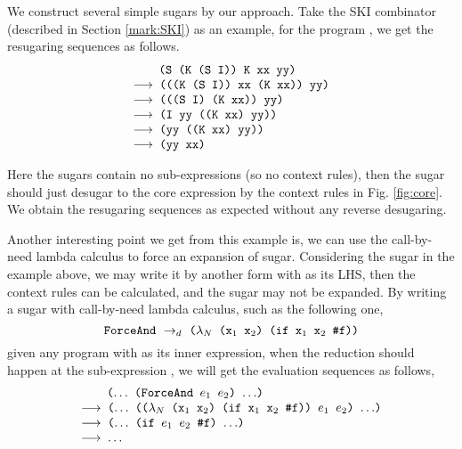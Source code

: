We construct several simple sugars by our approach. Take the SKI combinator (described in Section \ref{mark:SKI}) as an example, for the program , we get the resugaring sequences as follows.
\[
	\begin{array}{l}
		\quad\;\;\Code{ (S (K (S I)) K xx yy)}\\
	\OneStep{ \Code{ (((K (S I)) xx (K xx)) yy)}}\\
	\OneStep{ \Code{ (((S I) (K xx)) yy)}}\\
	\OneStep{ \Code{ (I yy ((K xx) yy))}}\\
	\OneStep{ \Code{ (yy ((K xx) yy))}}\\
	\OneStep{ \Code{ (yy xx)}}\\
	\end{array}
\]




Here the sugars contain no sub-expressions (so no context rules), then the sugar should just desugar to the core expression by the context rules in Fig. \ref{fig:core}.
We obtain the resugaring sequences as expected without any reverse desugaring.

Another interesting point we get from this example is, we can use the call-by-need lambda calculus to force an expansion of sugar. Considering the sugar  in the example above, we may write it by another form with  as its LHS, then the context rules can be calculated, and the sugar may not be expanded. By writing a sugar with call-by-need lambda calculus, such as the following one,
\[
\texttt{ForceAnd} ~\rightarrow_d~ \texttt{($\lambda_N$ ($\mbox{\tt x}_1$ $\mbox{\tt x}_2$) (if $\mbox{\tt x}_1$ $\mbox{\tt x}_2$ \#f))}
\]
given any program with  as its inner expression, when the reduction should happen at the sub-expression , we will get the evaluation sequences as follows,
\[
	\begin{array}{l}
		\quad\;\;\Code{ ($\ldots$ (ForceAnd $e_1$ $e_2$) $\ldots$)}\\
	\OneStep{ \Code{ ($\ldots$ (($\lambda_N$ ($\m{x}_1$ $\m{x}_2$) (if $\m{x}_1$ $\m{x}_2$ \false)) $e_1$ $e_2$) $\ldots$)}}\\
	\OneStep{ \Code{ ($\ldots$ (if $e_1$ $e_2$ \false) $\ldots$)}}\\
	\OneStep{ \Code{ $\ldots$}}\\
	\end{array}
\]
